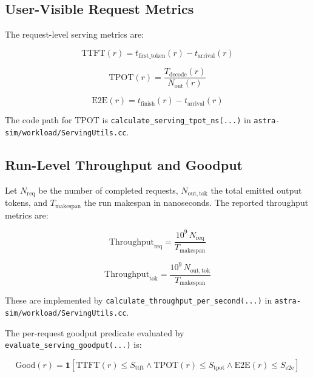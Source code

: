 \subsection{User-Visible Request Metrics}

The request-level serving metrics are:

\begin{equation*}
\mathrm{TTFT}(r) = t_{\mathrm{first\_token}}(r) - t_{\mathrm{arrival}}(r)
\end{equation*}

\begin{equation*}
\mathrm{TPOT}(r) = \frac{T_{\mathrm{decode}}(r)}{N_{\mathrm{out}}(r)}
\end{equation*}

\begin{equation*}
\mathrm{E2E}(r) = t_{\mathrm{finish}}(r) - t_{\mathrm{arrival}}(r)
\end{equation*}

The code path for \(\mathrm{TPOT}\) is
\texttt{calculate\_serving\_tpot\_ns(...)} in
\texttt{astra-sim/workload/ServingUtils.cc}.

\subsection{Run-Level Throughput and Goodput}

Let \(N_{\mathrm{req}}\) be the number of completed requests,
\(N_{\mathrm{out,tok}}\) the total emitted output tokens, and
\(T_{\mathrm{makespan}}\) the run makespan in nanoseconds. The reported
throughput metrics are:

\begin{equation*}
\mathrm{Throughput}_{\mathrm{req}} =
\frac{10^9 \, N_{\mathrm{req}}}{T_{\mathrm{makespan}}}
\end{equation*}

\begin{equation*}
\mathrm{Throughput}_{\mathrm{tok}} =
\frac{10^9 \, N_{\mathrm{out,tok}}}{T_{\mathrm{makespan}}}
\end{equation*}

These are implemented by
\texttt{calculate\_throughput\_per\_second(...)} in
\texttt{astra-sim/workload/ServingUtils.cc}.

The per-request goodput predicate evaluated by
\texttt{evaluate\_serving\_goodput(...)} is:

\begin{equation*}
\mathrm{Good}(r) =
\mathbf{1}\!\left[
\mathrm{TTFT}(r) \le S_{\mathrm{ttft}}
\land
\mathrm{TPOT}(r) \le S_{\mathrm{tpot}}
\land
\mathrm{E2E}(r) \le S_{\mathrm{e2e}}
\right]
\end{equation*}

